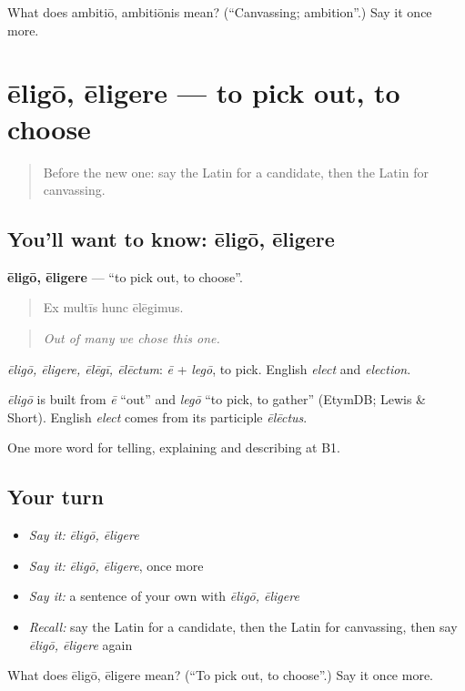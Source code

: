 \begin{tcolorbox}[breakable,colback=teal!4,colframe=teal!35!black,title={Before you move on}]
What does ambitiō, ambitiōnis mean? (\textquotedblleft{}Canvassing; ambition\textquotedblright{}.) Say it once more.
\end{tcolorbox}
\section[ēligō, ēligere]{ēligō, ēligere — to pick out, to choose}

\label{lesson:LA-C384-eligo}



\begin{quote}
Before the new one: say the Latin for a candidate, then the Latin for canvassing.
\end{quote}

\subsection*{You'll want to know: ēligō, ēligere}
\textbf{ēligō, ēligere} — \textquotedblleft{}to pick out, to choose\textquotedblright{}.

\begin{quote}
Ex multīs hunc ēlēgimus.
\end{quote}

\begin{quote}
\emph{Out of many we chose this one.}
\end{quote}

\emph{ēligō, ēligere, ēlēgī, ēlēctum}: \emph{ē} + \emph{legō}, to pick. English \emph{elect} and \emph{election}.

\begin{cousinweb}
\emph{ēligō} is built from \emph{ē} \textquotedblleft{}out\textquotedblright{} and \emph{legō} \textquotedblleft{}to pick, to gather\textquotedblright{} (EtymDB; Lewis \& Short). English \emph{elect} comes from its participle \emph{ēlēctus}.
\end{cousinweb}

\begin{grammarlens}[title={What you've built}]
One more word for telling, explaining and describing at B1.
\end{grammarlens}

\subsection*{Your turn}
\begin{itemize}
\raggedright
  \item \emph{Say it:} \emph{ēligō, ēligere}
  \item \emph{Say it:} \emph{ēligō, ēligere}, once more
  \item \emph{Say it:} a sentence of your own with \emph{ēligō, ēligere}
  \item \emph{Recall:} say the Latin for a candidate, then the Latin for canvassing, then say \emph{ēligō, ēligere} again
\end{itemize}

\begin{tcolorbox}[breakable,colback=teal!4,colframe=teal!35!black,title={Before you move on}]
What does ēligō, ēligere mean? (\textquotedblleft{}To pick out, to choose\textquotedblright{}.) Say it once more.
\end{tcolorbox}
